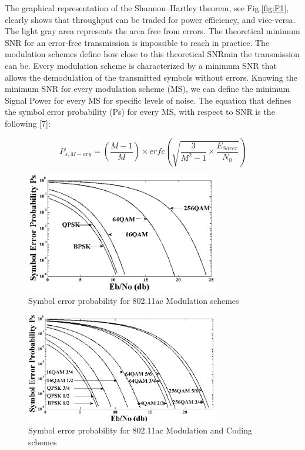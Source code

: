 	The graphical representation of the Shannon–Hartley theorem, see Fig.\ref{fig:F1}, clearly shows that throughput can be traded for power efficiency, and vice-versa. The light gray area represents the area free from errors. The theoretical minimum SNR for an error-free transmission is impossible to reach in practice. The modulation schemes define how close to this theoretical SNRmin the transmission can be. Every modulation scheme is characterized by a minimum SNR that allows the demodulation of the transmitted symbols without errors. Knowing the minimum SNR for every modulation scheme (MS), we can define the minimum Signal Power for every MS for specific levels of noise. The equation that defines the symbol error probability (Ps) for every MS, with respect to SNR is the following [7]:

\begin{equation}
P_{s,M-ary}= (\frac{M-1}{M}) \times erfc(\sqrt{\frac{3}{M^{2}-1} \times \frac{E_{Saver}}{N_{0}}})
\end{equation}

\begin{figure}
\centering
\includegraphics[width=0.75\textwidth]{F/image6.png}
\caption{Symbol error probability for 802.11ac Modulation schemes}
\label{fig:F2}
\end{figure}

\begin{figure}
\centering
\includegraphics[width=0.75\textwidth]{F/image7.png}
\caption{Symbol error probability for 802.11ac Modulation and Coding schemes}
\label{fig:F3}
\end{figure}

